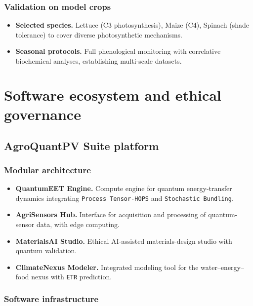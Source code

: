 \documentclass[12pt, a4paper]{article}
\begin{document}
\subsubsection{Validation on model crops}

\begin{itemize}
    \item \textbf{Selected species.} Lettuce (C3 photosynthesis), Maize (C4), Spinach (shade tolerance) to cover diverse photosynthetic mechanisms.
    
    \item \textbf{Seasonal protocols.} Full phenological monitoring with correlative biochemical analyses, establishing multi-scale datasets.
\end{itemize}

\section{Software ecosystem and ethical governance}

\subsection{AgroQuantPV Suite platform}

\subsubsection{Modular architecture}

\begin{itemize}
    \item \textbf{QuantumEET Engine.} Compute engine for quantum energy-transfer dynamics integrating \texttt{Process Tensor-HOPS} and \texttt{Stochastic Bundling}.
    
    \item \textbf{AgriSensors Hub.} Interface for acquisition and processing of quantum-sensor data, with edge computing.
    
    \item \textbf{MaterialsAI Studio.} Ethical AI-assisted materials-design studio with quantum validation.
    
    \item \textbf{ClimateNexus Modeler.} Integrated modeling tool for the water–energy–food nexus with \texttt{ETR} prediction.
\end{itemize}

\subsubsection{Software infrastructure}
\end{document}
